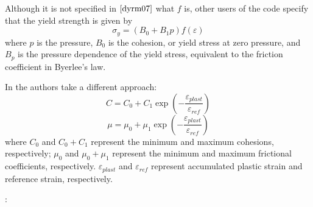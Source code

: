 Although it is not specified in $\cite{dyrm07}$ what $f$ is, other users of the code 
specify that the yield strength is given by 
\[
\sigma_y = (B_0 + B_1 p ) f(\varepsilon)
\]
where $p$ is the pressure, $B_0$ is the cohesion, or yield stress at
zero pressure, and $B_p$ is the pressure dependence of the yield
stress, equivalent to the friction coefficient in Byerlee’s law. 

In \cite{yamz18} the authors take a different approach:
\[
C=C_0+C_1 \exp \left( -\frac{\varepsilon_{plast}}{\varepsilon_{ref}} \right)
\]
\[
\mu=\mu_0+\mu_1 \exp \left( -\frac{\varepsilon_{plast}}{\varepsilon_{ref}} \right)
\]
where $C_0$ and $C_0+C_1$ represent the minimum and maximum cohesions, respectively;
$\mu_0$ and $\mu_0+\mu_1$ represent the minimum and maximum frictional coefficients, respectively. 
$\varepsilon_{plast}$ and $\varepsilon_{ref}$ represent accumulated plastic strain and 
reference strain, respectively.




\Literature: \cite{nigo15}
